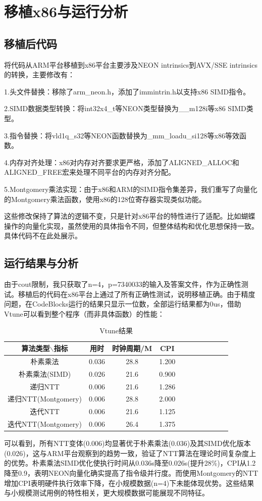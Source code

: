 \documentclass[a4paper]{article}
\begin{document}
\section{移植x86与运行分析}
\subsection{移植后代码}
将代码从ARM平台移植到x86平台主要涉及NEON intrinsics到AVX/SSE intrinsics的转换，主要修改有：

1.头文件替换：移除了arm\_neon.h，添加了immintrin.h以支持x86 SIMD指令。

2.SIMD数据类型转换：将int32x4\_t等NEON类型替换为\_\_m128i等x86 SIMD类型。

3.指令替换：将vld1q\_s32等NEON函数替换为\_mm\_loadu\_si128等x86等效函数。

4.内存对齐处理：x86对内存对齐要求更严格，添加了ALIGNED\_ALLOC和ALIGNED\_FREE宏来处理不同平台的内存对齐分配。

5.Montgomery乘法实现：由于x86和ARM的SIMD指令集差异，我们重写了向量化的Montgomery乘法函数，使用x86的128位寄存器实现类似功能。

这些修改保持了算法的逻辑不变，只是针对x86平台的特性进行了适配。比如蝴蝶操作的向量化实现，虽然使用的具体指令不同，但整体结构和优化思想保持一致。具体代码不在此处展示。
\subsection{运行结果与分析}
由于cout限制，我只获取了n=4，p=7340033的输入及答案文件，作为正确性测试。移植后的代码在x86平台上通过了所有正确性测试，说明移植正确。由于精度问题，在CodeBlocks运行的结果只显示一位数，全部运行结果都为0us，借助Vtune可以看到整个程序（而非具体函数）的性能：
\begin{table}[!htbp]
	\centering
	\begin{tabular}{ccccccccccc}
		\toprule  
		算法类型$\backslash$指标& 用时& 时钟周期/M& CPI\\
		\midrule
		朴素乘法& 0.036& 28.8& 1.200\\
		朴素乘法(SIMD)& 0.026& 21.6& 0.900\\
		递归NTT& 0.006& 21.6& 1.286\\
		递归NTT(Montgomery)& 0.006& 28.8& 2.000\\
		迭代NTT& 0.006& 21.6& 1.125\\
		迭代NTT(Montgomery)& 0.006& 26.4& 1.375\\
		\bottomrule
	\end{tabular}
	\caption{Vtune结果}
	\label{table:t3}
\end{table}
可以看到，所有NTT变体(0.006)均显著优于朴素乘法(0.036)及其SIMD优化版本(0.026)，这与ARM平台观察到的趋势一致，验证了NTT算法在理论时间复杂度上的优势。朴素乘法SIMD优化使执行时间从0.036s降至0.026s(提升28\%)，CPI从1.2降至0.9，表明NEON向量化确实提高了指令级并行度。而使用Montgomery的NTT增加CPI表明硬件执行效率下降，在小规模数据(n=4)下未能体现优势。这些结果与小规模测试用例的特性相关，更大规模数据可能展现不同特征。
\end{document}
